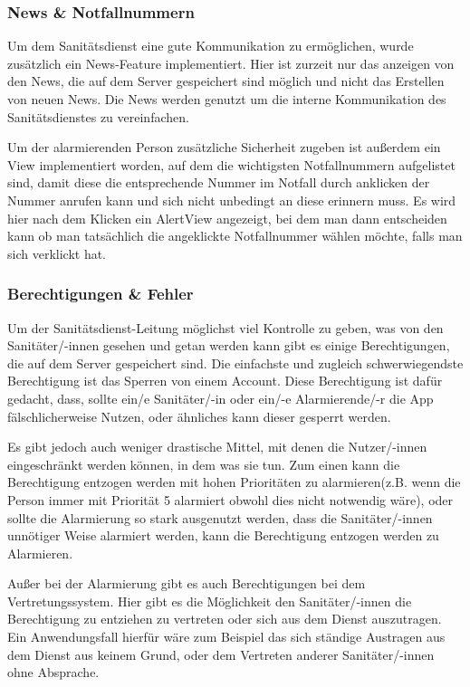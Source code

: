 \subsubsection{News \& Notfallnummern}
    Um dem Sanitätsdienst eine gute Kommunikation zu ermöglichen, wurde zusätzlich ein 
    News-Feature implementiert. Hier ist zurzeit nur das anzeigen von den News, die auf 
    dem Server gespeichert sind möglich und nicht das Erstellen von neuen News. Die News 
    werden genutzt um die interne Kommunikation des Sanitätsdienstes zu vereinfachen.

    Um der alarmierenden Person zusätzliche Sicherheit zugeben ist außerdem ein View 
    implementiert worden, auf dem die wichtigsten Notfallnummern aufgelistet sind,
    damit diese die entsprechende Nummer im Notfall durch anklicken der Nummer anrufen 
    kann und sich nicht unbedingt an diese erinnern muss. Es wird hier nach dem Klicken 
    ein AlertView angezeigt, bei dem man dann entscheiden kann ob man tatsächlich die 
    angeklickte Notfallnummer wählen möchte, falls man sich verklickt hat.
    
\subsubsection{Berechtigungen \& Fehler}
    Um der Sanitätsdienst-Leitung möglichst viel Kontrolle zu geben, was von den 
    Sanitäter/-innen gesehen und getan werden kann gibt es einige Berechtigungen, die 
    auf dem Server gespeichert sind. Die einfachste und zugleich schwerwiegendste 
    Berechtigung ist das Sperren von einem Account. Diese Berechtigung ist dafür 
    gedacht, dass, sollte ein/e Sanitäter/-in oder ein/-e Alarmierende/-r die App
    fälschlicherweise Nutzen, oder ähnliches kann dieser gesperrt werden.

    Es gibt jedoch auch weniger drastische Mittel, mit denen die Nutzer/-innen 
    eingeschränkt werden können, in dem was sie tun. Zum einen kann die Berechtigung 
    entzogen werden mit hohen Prioritäten zu alarmieren(z.B. wenn die Person immer 
    mit Priorität 5 alarmiert obwohl dies nicht notwendig wäre), oder sollte die 
    Alarmierung so stark ausgenutzt werden, dass die Sanitäter/-innen unnötiger Weise 
    alarmiert werden, kann die Berechtigung entzogen werden zu Alarmieren.

    Außer bei der Alarmierung gibt es auch Berechtigungen bei dem Vertretungssystem. 
    Hier gibt es die Möglichkeit den Sanitäter/-innen die Berechtigung zu entziehen 
    zu vertreten oder sich aus dem Dienst auszutragen. Ein Anwendungsfall hierfür wäre 
    zum Beispiel das sich ständige Austragen aus dem Dienst aus keinem Grund, oder dem 
    Vertreten anderer Sanitäter/-innen ohne Absprache.

